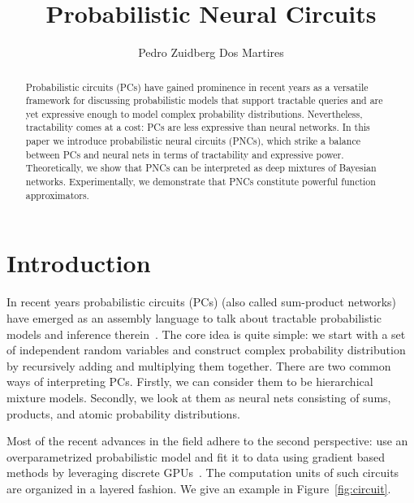 \documentclass[letterpaper]{article} %
\title{Probabilistic Neural Circuits}
\author {
	Pedro Zuidberg Dos Martires
}
\begin{document}
\maketitle

\begin{abstract}
	Probabilistic circuits (PCs) have gained prominence in recent years as a versatile framework for discussing probabilistic models that support tractable queries and are yet expressive enough to model complex probability distributions.
	Nevertheless, tractability comes at a cost: PCs are less expressive than neural networks.
	In this paper we introduce probabilistic neural circuits (PNCs), which strike a balance between PCs and neural nets in terms of tractability and expressive power. Theoretically, we show that PNCs can be interpreted as deep mixtures of Bayesian networks. Experimentally, we demonstrate that PNCs constitute powerful function approximators.
\end{abstract}




\section{Introduction}

In recent years probabilistic circuits (PCs) (also called sum-product networks)~\citep{darwiche2003differential,poon2011sum} have emerged as an assembly language to talk about tractable probabilistic models and inference therein~\citep{vergari2021compositional}. The core idea is quite simple: we start with a set of independent random variables and construct complex probability distribution by recursively adding and multiplying them together.
There are two common ways of interpreting PCs. Firstly, we can consider them to be hierarchical mixture models. Secondly, we look at them as neural nets consisting of sums, products, and atomic probability distributions.

Most of the recent advances in the field adhere to the second perspective: use an overparametrized probabilistic model and fit it to data using gradient based methods by leveraging discrete GPUs~\citep{peharz2019random,dang2021juice}. The computation units of such circuits are organized in a layered fashion. We give an example in Figure~\ref{fig:circuit}.
\end{document}
